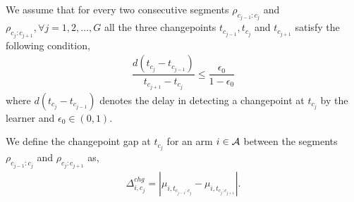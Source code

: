 



%
%
%

\begin{assumption}
\label{assm:space-gap}
We assume that for every two consecutive segments $\rho_{c_{j-1}:c_j}$ and $\rho_{c_j:c_{j+1}}, \forall j=1,2,\ldots,G$ all the three  changepoints $t_{c_{j-1}}, t_{c_j}$ and $t_{c_{j+1}}$ satisfy the following condition,
\begin{align*}
\dfrac{d(t_{c_j} - t_{c_{j-1}})}{t_{c_{j+1}} - t_{c_j}} \leq \dfrac{\epsilon_0}{1-\epsilon_0}
\end{align*}
where $d(t_{c_j} - t_{c_{j-1}})$ denotes the delay in detecting a changepoint at $t_{c_j}$ by the learner and $ \epsilon_0 \in (0,1)$.
\end{assumption}

\begin{definition}
\label{Def:chg-gap}
We define the changepoint gap at $t_{c_j}$ for an arm $i\in\mathcal{A}$ between the segments $\rho_{c_{j-1}:c_j}$ and $\rho_{c_j:c_{j+1}}$ as,
\begin{align*}
\Delta^{chg}_{i,c_j}=|\mu_{i,t_{c_{j-1}:c_j}}-\mu_{i,t_{c_j:c_{j+1}}}|.
\end{align*}
\end{definition}

